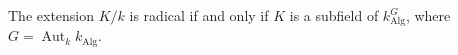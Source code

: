 The extension $K/k$ is radical if and only if $K$ is a subfield of $k_{\text{Alg}}^G$, where $G = \operatorname{Aut}_k k_{\text{Alg}}$.
